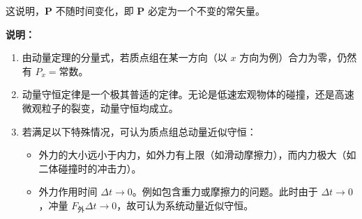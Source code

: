 	\noindent 这说明，$\boldsymbol{P}$ 不随时间变化，即 $\boldsymbol{P}$ 必定为一个不变的常矢量。
	
	\noindent\textbf{说明：}
	\begin{enumerate}
		\item 由动量定理的分量式，若质点组在某一方向（以 $x$ 方向为例）合力为零，仍然有 $P_x = \text{常数}$。
		\item 动量守恒定律是一个极其普适的定律。无论是低速宏观物体的碰撞，还是高速微观粒子的裂变，动量守恒均成立。
		\item 若满足以下特殊情况，可认为质点组总动量近似守恒：
		\begin{itemize}
			\item 外力的大小远小于内力，如外力有上限（如滑动摩擦力），而内力极大（如二体碰撞时的冲击力）。
			\item 外力作用时间 $\Delta t \to 0$。例如包含重力或摩擦力的问题。此时由于 $\Delta t \to 0$，冲量 $F_{\text{外}}\Delta t \to 0$，故可认为系统动量近似守恒。
		\end{itemize}
	\end{enumerate}
	
	
	

